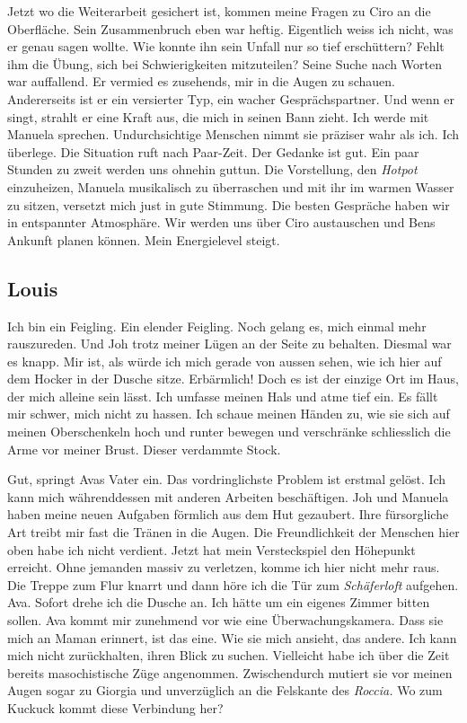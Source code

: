 Jetzt wo die Weiterarbeit gesichert ist, kommen meine Fragen zu Ciro an
die Oberfläche. Sein Zusammenbruch eben war heftig. Eigentlich weiss ich
nicht, was er genau sagen wollte. Wie konnte ihn sein Unfall nur so tief
erschüttern? Fehlt ihm die Übung, sich bei Schwierigkeiten mitzuteilen?
Seine Suche nach Worten war auffallend. Er vermied es zusehends, mir in
die Augen zu schauen. Andererseits ist er ein versierter Typ, ein wacher
Gesprächspartner. Und wenn er singt, strahlt er eine Kraft aus, die mich
in seinen Bann zieht.
Ich werde mit Manuela sprechen. Undurchsichtige Menschen nimmt sie
präziser wahr als ich. Ich überlege. Die Situation ruft nach Paar-Zeit.
Der Gedanke ist gut. Ein paar Stunden zu zweit werden uns ohnehin
guttun. Die Vorstellung, den \emph{Hotpot} einzuheizen, Manuela
musikalisch zu überraschen und mit ihr im warmen Wasser zu sitzen,
versetzt mich just in gute Stimmung. Die besten Gespräche haben wir in
entspannter Atmosphäre. Wir werden uns über Ciro austauschen und Bens
Ankunft planen können. Mein Energielevel steigt.

\subsection{Louis}

Ich bin ein Feigling. Ein elender Feigling. Noch gelang es, mich einmal
mehr rauszureden. Und Joh trotz meiner Lügen an der Seite zu behalten.
Diesmal war es knapp. Mir ist, als würde ich mich gerade von aussen
sehen, wie ich hier auf dem Hocker in der Dusche sitze. Erbärmlich!
Doch es ist der einzige Ort im Haus, der mich alleine sein lässt. Ich
umfasse meinen Hals und atme tief ein. Es fällt mir schwer, mich nicht zu
hassen. Ich schaue meinen Händen zu, wie sie sich auf meinen Oberschenkeln 
hoch und runter bewegen und verschränke schliesslich die Arme vor meiner Brust. Dieser verdammte
Stock.

Gut, springt Avas Vater ein. Das vordringlichste Problem
ist erstmal gelöst. Ich kann mich
währenddessen mit anderen Arbeiten beschäftigen. Joh und Manuela haben
meine neuen Aufgaben förmlich aus dem Hut gezaubert. Ihre fürsorgliche
Art treibt mir fast die Tränen in die Augen. Die Freundlichkeit der Menschen hier oben habe ich nicht verdient.
Jetzt hat mein Versteckspiel den Höhepunkt erreicht. Ohne jemanden massiv zu verletzen,
komme ich hier nicht mehr raus.
Die Treppe zum Flur knarrt und dann höre ich die Tür zum 
\emph{Schäferloft} aufgehen. Ava. Sofort drehe ich die Dusche an. Ich
hätte um ein eigenes Zimmer bitten sollen.
Ava kommt mir zunehmend vor wie eine Überwachungskamera. Dass sie mich
an Maman erinnert, ist das eine. Wie sie mich ansieht, das andere. Ich
kann mich nicht zurückhalten, ihren Blick zu suchen. Vielleicht habe ich
über die Zeit bereits masochistische Züge angenommen. Zwischendurch mutiert sie vor
meinen Augen sogar zu Giorgia und unverzüglich an die Felskante des
\emph{Roccia.} Wo zum Kuckuck kommt diese Verbindung her?

